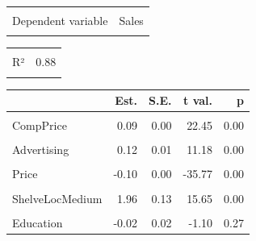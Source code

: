 \documentclass[
]{article}
\begin{document}
\begin{table}[!h]
\centering
\begin{tabular}{lr}
\toprule
\cellcolor{gray!6}{Observations} & \cellcolor{gray!6}{400}\\
Dependent variable & Sales\\
\cellcolor{gray!6}{Type} & \cellcolor{gray!6}{OLS linear regression}\\
\bottomrule
\end{tabular}
\end{table} \begin{table}[!h]
\centering
\begin{tabular}{lr}
\toprule
\cellcolor{gray!6}{F(12,387)} & \cellcolor{gray!6}{225.99}\\
R² & 0.88\\
\cellcolor{gray!6}{Adj. R²} & \cellcolor{gray!6}{0.87}\\
\bottomrule
\end{tabular}
\end{table} \begin{table}[!h]
\centering
\begin{threeparttable}
\begin{tabular}{lrrrr}
\toprule
  & Est. & S.E. & t val. & p\\
\midrule
\cellcolor{gray!6}{(Intercept)} & \cellcolor{gray!6}{6.20} & \cellcolor{gray!6}{0.64} & \cellcolor{gray!6}{9.63} & \cellcolor{gray!6}{0.00}\\
CompPrice & 0.09 & 0.00 & 22.45 & 0.00\\
\cellcolor{gray!6}{Income} & \cellcolor{gray!6}{0.01} & \cellcolor{gray!6}{0.00} & \cellcolor{gray!6}{2.06} & \cellcolor{gray!6}{0.04}\\
Advertising & 0.12 & 0.01 & 11.18 & 0.00\\
\cellcolor{gray!6}{Population} & \cellcolor{gray!6}{-0.00} & \cellcolor{gray!6}{0.00} & \cellcolor{gray!6}{-1.90} & \cellcolor{gray!6}{0.06}\\
\addlinespace
Price & -0.10 & 0.00 & -35.77 & 0.00\\
\cellcolor{gray!6}{ShelveLocGood} & \cellcolor{gray!6}{4.86} & \cellcolor{gray!6}{0.15} & \cellcolor{gray!6}{31.90} & \cellcolor{gray!6}{0.00}\\
ShelveLocMedium & 1.96 & 0.13 & 15.65 & 0.00\\
\cellcolor{gray!6}{Age} & \cellcolor{gray!6}{-0.05} & \cellcolor{gray!6}{0.00} & \cellcolor{gray!6}{-14.41} & \cellcolor{gray!6}{0.00}\\
Education & -0.02 & 0.02 & -1.10 & 0.27\\

\end{tabular}
\end{threeparttable}
\end{table}
\end{document}
